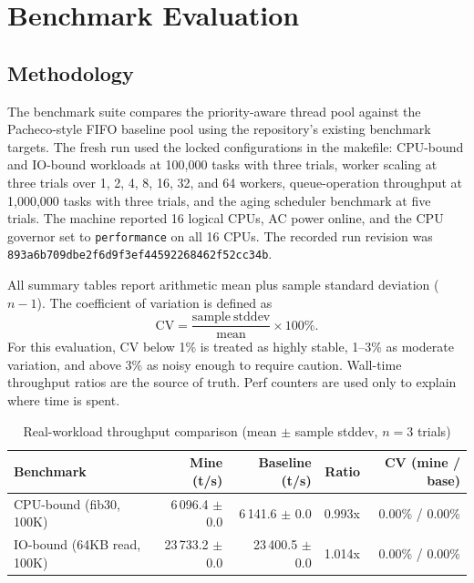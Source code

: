 
\section{Benchmark Evaluation}

\subsection{Methodology}

The benchmark suite compares the priority-aware thread pool against the
Pacheco-style FIFO baseline pool using the repository's existing benchmark targets.
The fresh run used the locked configurations in the makefile: CPU-bound and
IO-bound workloads at 100,000 tasks with three trials, worker scaling at three
trials over 1, 2, 4, 8, 16, 32, and 64 workers, queue-operation throughput at
1,000,000 tasks with three trials, and the aging scheduler benchmark at five
trials. The machine reported 16 logical CPUs, AC power online, and the CPU
governor set to \texttt{performance} on all 16 CPUs. The recorded run revision
was \texttt{893a6b709dbe2f6d9f3ef44592268462f52cc34b}.

All summary tables report arithmetic mean plus sample standard deviation
($n-1$). The coefficient of variation is defined as
\[
  \mathrm{CV} = \frac{\mathrm{sample\ stddev}}{\mathrm{mean}} \times 100\%.
\]
For this evaluation, CV below 1\% is treated as highly stable, 1--3\% as
moderate variation, and above 3\% as noisy enough to require caution. Wall-time
throughput ratios are the source of truth. Perf counters are used only to
explain where time is spent.

\begin{table}[htbp]
\centering
\caption{Real-workload throughput comparison (mean $\pm$ sample stddev, $n=3$ trials)}
\label{tab:real_workload}
\begin{tabular}{lrrrr}
\toprule
Benchmark & Mine (t/s) & Baseline (t/s) & Ratio & CV (mine / base) \\
\midrule
CPU-bound (fib30, 100K) & 6\,096.4 $\pm$ 0.0 & 6\,141.6 $\pm$ 0.0 & 0.993x & 0.00\% / 0.00\% \\
IO-bound (64KB read, 100K) & 23\,733.2 $\pm$ 0.0 & 23\,400.5 $\pm$ 0.0 & 1.014x & 0.00\% / 0.00\% \\
\bottomrule
\end{tabular}
\end{table}

